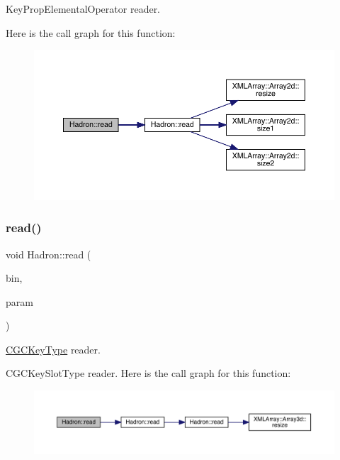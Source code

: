 Key\+Prop\+Elemental\+Operator reader. 

Here is the call graph for this function\+:
\nopagebreak
\begin{figure}[H]
\begin{center}
\leavevmode
\includegraphics[width=350pt]{d1/daf/namespaceHadron_ac7fbe05fdb59de181eed9428364667e3_cgraph}
\end{center}
\end{figure}
\mbox{\label{namespaceHadron_a0fa916d0de711ad2cf389173ad463f51}} 
\subsubsection{\texorpdfstring{read()}{read()}\hspace{0.1cm}{\footnotesize\ttfamily [25/94]}}
{\footnotesize\ttfamily void Hadron\+::read (\begin{DoxyParamCaption}\item[{\mbox{\hyperlink{classADATIO_1_1BinaryReader}{Binary\+Reader}} \&}]{bin,  }\item[{\mbox{\hyperlink{structHadron_1_1KeyCGCIrrepMom__t}{Key\+C\+G\+C\+Irrep\+Mom\+\_\+t}} \&}]{param }\end{DoxyParamCaption})}



\mbox{\hyperlink{structHadron_1_1CGCKeyType}{C\+G\+C\+Key\+Type}} reader. 

C\+G\+C\+Key\+Slot\+Type reader. Here is the call graph for this function\+:
\nopagebreak
\begin{figure}[H]
\begin{center}
\leavevmode
\includegraphics[width=350pt]{d1/daf/namespaceHadron_a0fa916d0de711ad2cf389173ad463f51_cgraph}
\end{center}
\end{figure}
\mbox{\label{namespaceHadron_a1a172c91f55bd8989d9751c7f8b5ac28}} 
